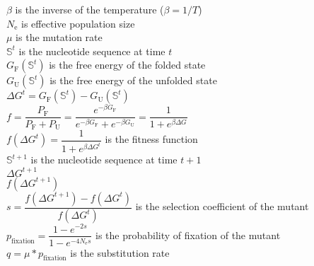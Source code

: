 \documentclass[8pt]{beamer}
\begin{document}
	\begin{frame}
		$\beta$ is the inverse of the temperature ($\beta=1/T$)  \\
		$N_\mathrm{e}$ is effective population size  \\
		$\mu$ is the mutation rate  \\
		$\mathbb{S}^t$ is the nucleotide sequence at time $t$ \\
		$G_{\mathrm{F}}(\mathbb{S}^t)$ is the free energy of the folded state  \\
		$G_{\mathrm{U}}(\mathbb{S}^t)$ is the free energy of the unfolded state  \\
		$\Delta G^t = G_{\mathrm{F}}(\mathbb{S}^t) - G_{\mathrm{U}}(\mathbb{S}^t)$ \\
		$ f = \dfrac{P_{\mathrm{F}}}{P_{\mathrm{F}} + P_{\mathrm{U}}} = \dfrac{e^{-\beta G_{\mathrm{F}}}}{e^{-\beta G_{\mathrm{F}}} + e^{-\beta G_{\mathrm{U}}}} = \dfrac{1}{1 + e^{\beta \Delta G}} $ \\
		$ f (\Delta G^t) =  \dfrac{1}{1 + e^{\beta \Delta G^t}} $ is the fitness function\\
		$\mathbb{S}^{t+1}$ is the nucleotide sequence at time $t+1$ \\
		$\Delta G^{t+1}$ \\
		$ f(\Delta G^{t+1})$ \\
		$ s =  \dfrac{f(\Delta G^{t+1}) - f(\Delta G^{t})}{f(\Delta G^{t})} $ is the selection coefficient of the mutant\\
		$ p_{\mathrm{fixation}} =   \dfrac{1 - e^{-2s} }{1 - e^{-4 N_\mathrm{e} s}} $ is the probability of fixation of the mutant\\
		$ q = \mu * p_{\mathrm{fixation}} $ is the substitution rate\\
	\end{frame}
	
\end{document}
